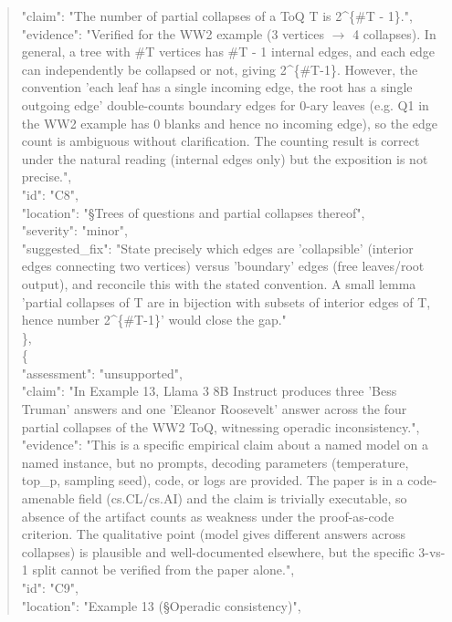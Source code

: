 \documentclass[11pt]{article}
\begin{document}
\begin{quote}
      "claim": "The number of partial collapses of a ToQ T is 2\^{}\{\#T - 1\}.",\\
      "evidence": "Verified for the WW2 example (3 vertices \ensuremath{\to} 4 collapses). In general, a tree with \#T vertices has \#T - 1 internal edges, and each edge can independently be collapsed or not, giving 2\^{}\{\#T-1\}. However, the convention 'each leaf has a single incoming edge, the root has a single outgoing edge' double-counts boundary edges for 0-ary leaves (e.g. Q1 in the WW2 example has 0 blanks and hence no incoming edge), so the edge count is ambiguous without clarification. The counting result is correct under the natural reading (internal edges only) but the exposition is not precise.",\\
      "id": "C8",\\
      "location": "§Trees of questions and partial collapses thereof",\\
      "severity": "minor",\\
      "suggested\_fix": "State precisely which edges are 'collapsible' (interior edges connecting two vertices) versus 'boundary' edges (free leaves/root output), and reconcile this with the stated convention. A small lemma 'partial collapses of T are in bijection with subsets of interior edges of T, hence number 2\^{}\{\#T-1\}' would close the gap."\\
    \},\\
    \{\\
      "assessment": "unsupported",\\
      "claim": "In Example 13, Llama 3 8B Instruct produces three 'Bess Truman' answers and one 'Eleanor Roosevelt' answer across the four partial collapses of the WW2 ToQ, witnessing operadic inconsistency.",\\
      "evidence": "This is a specific empirical claim about a named model on a named instance, but no prompts, decoding parameters (temperature, top\_p, sampling seed), code, or logs are provided. The paper is in a code-amenable field (cs.CL/cs.AI) and the claim is trivially executable, so absence of the artifact counts as weakness under the proof-as-code criterion. The qualitative point (model gives different answers across collapses) is plausible and well-documented elsewhere, but the specific 3-vs-1 split cannot be verified from the paper alone.",\\
      "id": "C9",\\
      "location": "Example 13 (§Operadic consistency)",\\

\end{quote}
\end{document}
